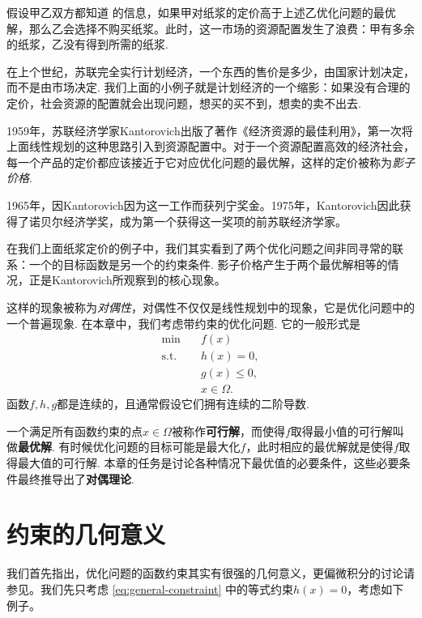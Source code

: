 假设甲乙双方都知道 的信息，如果甲对纸浆的定价高于上述乙优化问题的最优解，那么乙会选择不购买纸浆。此时，这一市场的资源配置发生了浪费：甲有多余的纸浆，乙没有得到所需的纸浆.

在上个世纪，苏联完全实行计划经济，一个东西的售价是多少，由国家计划决定，而不是由市场决定. 我们上面的小例子就是计划经济的一个缩影：如果没有合理的定价，社会资源的配置就会出现问题，想买的买不到，想卖的卖不出去.

1959年，苏联经济学家Kantorovich出版了著作《经济资源的最佳利用》，第一次将上面线性规划的这种思路引入到资源配置中。对于一个资源配置高效的经济社会，每一个产品的定价都应该接近于它对应优化问题的最优解，这样的定价被称为\emph{影子价格}. 

1965年，因Kantorovich因为这一工作而获列宁奖金。1975年，Kantorovich因此获得了诺贝尔经济学奖，成为第一个获得这一奖项的前苏联经济学家。

在我们上面纸浆定价的例子中，我们其实看到了两个优化问题之间非同寻常的联系：一个的目标函数是另一个的约束条件. 影子价格产生于两个最优解相等的情况，正是Kantorovich所观察到的核心现象。

这样的现象被称为\emph{对偶性}，对偶性不仅仅是线性规划中的现象，它是优化问题中的一个普遍现象. 在本章中，我们考虑带约束的优化问题. 它的一般形式是
\begin{equation}
\begin{aligned}
    \min\quad& f(x) \\
    \text{s.t.}\quad& {h}(x)={0},\\
    & {g}(x)\leq {0}, \\
    & x \in \Omega.
\end{aligned}\label{eq:general-constraint}    
\end{equation}
函数$f,h,g$都是连续的，且通常假设它们拥有连续的二阶导数.

一个满足所有函数约束的点$x\in\Omega$被称作\textbf{可行解}，而使得$f$取得最小值的可行解叫做\textbf{最优解}. 有时候优化问题的目标可能是最大化$f$，此时相应的最优解就是使得$f$取得最大值的可行解. 本章的任务是讨论各种情况下最优值的必要条件，这些必要条件最终推导出了\textbf{对偶理论}. 

\section{约束的几何意义}

我们首先指出，优化问题的函数约束其实有很强的几何意义，更偏微积分的讨论请参见。我们先只考虑 \eqref{eq:general-constraint} 中的等式约束$h(x)=0$，考虑如下例子。

